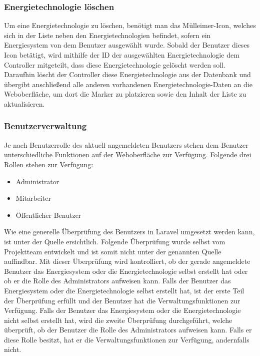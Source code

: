 \newpage
\subsubsection{Energietechnologie löschen}
Um eine Energietechnologie zu löschen, benötigt man das Mülleimer-Icon, welches sich in der Liste neben den Energietechnologien befindet, sofern ein Energiesystem von dem Benutzer ausgewählt wurde.
Sobald der Benutzer dieses Icon betätigt, wird mithilfe der ID der ausgewählten Energietechnologie dem Controller mitgeteilt, dass diese Energietechnologie gelöscht werden soll. Daraufhin löscht der Controller diese Energietechnologie aus der Datenbank und übergibt anschließend alle anderen vorhandenen Energietechnologie-Daten an die Weboberfläche, um dort die Marker zu platzieren sowie den Inhalt der Liste zu aktualisieren.


\subsubsection{Benutzerverwaltung}
Je nach Benutzerrolle des aktuell angemeldeten Benutzers stehen dem Benutzer unterschiedliche Funktionen auf der Weboberfläche zur Verfügung.  
Folgende drei Rollen stehen zur Verfügung:
\begin{itemize}
	\item Administrator 
	\item Mitarbeiter
	\item Öffentlicher Benutzer
\end{itemize}
Wie eine generelle Überprüfung des Benutzers in Laravel umgesetzt werden kann, ist unter der Quelle \cite{LaravelAuth} ersichtlich. 
\newline Folgende Überprüfung wurde selbst vom Projektteam entwickelt und ist somit nicht unter der genannten Quelle auffindbar.\newline \newline
Mit dieser Überprüfung wird kontrolliert, ob der gerade angemeldete Benutzer das Energiesystem oder die Energietechnologie selbst erstellt hat oder ob er die Rolle des Administrators aufweisen kann. Falls der Benutzer das Energiesystem oder die Energietechnologie selbst erstellt hat, ist der erste Teil der Überprüfung erfüllt und der Benutzer hat die Verwaltungsfunktionen zur Verfügung. Falls der Benutzer das Energiesystem oder die Energietechnologie nicht selbst erstellt hat, wird die zweite Überprüfung durchgeführt, welche überprüft, ob der Benutzer die Rolle des Administrators aufweisen kann. Falls er diese Rolle besitzt, hat er die Verwaltungsfunktionen zur Verfügung, andernfalls nicht.


